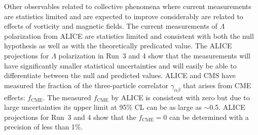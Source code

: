 Other observables related to collective phenomena where current 
  measurements are statistics limited and are expected to improve 
  considerably are related to effects of vorticity and magnetic fields.
%
The current measurements of $\Lambda$ polarization from ALICE are statistics limited
  and consistent with both the null hypothesis as well as with the theoretically
  predicated value.
The ALICE projections for $\Lambda$ polarization in Run~3 and 4 show that 
  the measurements will have significantly smaller statistical uncertainties 
  and will easily be able to differentiate between the null and predicted values. 
%
ALICE and CMS have measured the fraction of the three-particle correlator
  $\gamma_{\alpha\beta}$ that arises from CME effects: $f_{\mathrm{CME}}$.
The measured $f_{\mathrm{CME}}$ by ALICE is consistent with zero but due to 
  large uncertainties its upper limit at 95\% CL can be as large as $\sim$0.5.
ALICE projections for Run~3 and 4 show that the $f_{\mathrm{CME}}=0$ can 
  be determined with a precision of less than 1\%.


















